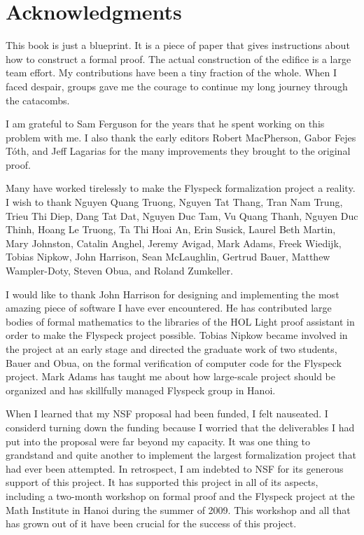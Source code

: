 

\section*{Acknowledgments}

This book is just a blueprint.  It is a piece of paper that gives instructions
about how to construct a formal proof.  The actual construction of the edifice
is a large team effort.  My contributions have been a tiny fraction of the whole.
When I faced despair, groups gave me the courage
to continue my long journey through the catacombs.

I am grateful to Sam Ferguson for the years that he spent working on
this problem with me.  I also thank the early editors Robert
MacPherson, Gabor Fejes T\'oth, and Jeff Lagarias for the many
improvements they brought to the original proof.

Many have worked tirelessly to make the Flyspeck formalization project
a reality.  I wish to thank Nguyen Quang
Truong, %
Nguyen Tat Thang, %
Tran Nam Trung, Trieu Thi Diep, Dang Tat Dat, Nguyen Duc Tam, Vu Quang
Thanh, Nguyen Duc Thinh, Hoang Le Truong, Ta Thi Hoai An, Erin Susick,
Laurel Beth Martin, Mary Johnston, Catalin Anghel, Jeremy Avigad, Mark
Adams, Freek Wiedijk, Tobias Nipkow, John Harrison, Sean McLaughlin,
Gertrud Bauer, Matthew Wampler-Doty, Steven Obua, and Roland
Zumkeller.

I would like to thank John Harrison for designing and implementing the
most amazing piece of software I have ever encountered.  He has
contributed large bodies of formal mathematics to the libraries of the
HOL Light proof assistant in order to make the Flyspeck project
possible.  Tobias Nipkow became involved in the project at an early
stage and directed the graduate work of two students, Bauer and Obua,
on the formal verification of computer code for the Flyspeck
project. Mark Adams has taught me about how large-scale project should
be organized and has skillfully managed Flyspeck group in Hanoi.

  When I learned that my NSF proposal had been funded, I felt
  nauseated.  I considerd turning down the
  funding because I worried that the  deliverables I had put
  into the proposal were far beyond my capacity.  It was one thing to
  grandstand and quite another to implement the largest
  formalization project that had ever been attempted.  In retrospect, I
  am indebted to NSF for its generous support of this project.  It has supported
  this project in all of its aspects, including a
  two-month  workshop on formal proof
  and the Flyspeck project  at the Math Institute in Hanoi during the summer of
  2009.  This workshop and all that has grown out of it have been crucial for
  the success of this project.

